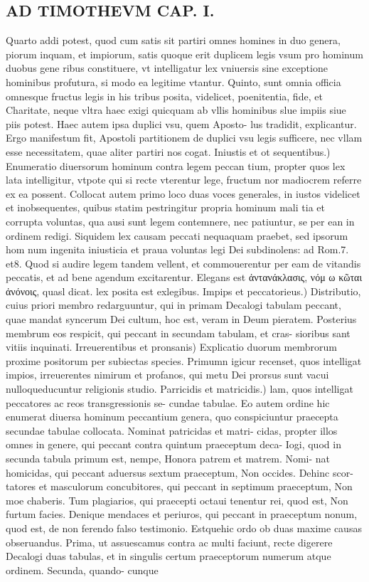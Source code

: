 \documentclass{article}
\begin{document}
\begin{pages}
\section*{AD TIMOTHEVM CAP. I. }
\marginpar{[ p.28 ]}\pstart Quarto addi potest, quod cum satis sit partiri omnes homines in duo genera, piorum inquam, et impiorum, satis quoque  erit duplicem legis vsum pro hominum duobus gene ribus constituere, vt intelligatur lex vniuersis sine exceptione hominibus profutura, si modo ea legitime vtantur. Quinto, sunt omnia officia omnesque  fructus legis in his tribus posita, videlicet, poenitentia, fide, et Charitate, neque  vltra haec exigi quicquam ab vllis hominibus slue impiis siue piis potest. Haec autem ipsa duplici vsu, quem Aposto- lus tradidit, explicantur. Ergo manifestum fit, Apostoli partitionem de duplici vsu legis sufficere, nec vllam esse necessitatem, quae aliter partiri nos cogat.  \pend\pstart Iniustis et ot sequentibus.) Enumeratio diuersorum hominum contra legem peccan tium, propter quos lex lata intelligitur, vtpote qui si recte vterentur lege, fructum nor madiocrem referre ex ea possent. Collocat autem primo loco duas voces generales, in iustos videlicet et inobsequentes, quibus statim pestringitur propria hominum mali tia et corrupta voluntas, qua ausi sunt legem contemnere, nec patiuntur, se per ean in ordinem redigi. Siquidem lex causam peccati nequaquam praebet, sed ipsorum hom num ingenita iniusticia et praua voluntas legi Dei subdinolens: ad Rom.7. et8. Quod si audire legem tandem vellent, et commouerentur per eam de vitandis peccatis, et ad bene agendum excitarentur. Elegans est ἀντανάκλασις, νόμ ω κῶται ἀνόνοις, quasl dicat. lex posita est exlegibus.  \pend\pstart Impips et peccatorieus.) Distributio, cuius priori membro redarguuntur, qui in primam Decalogi tabulam peccant, quae mandat syncerum Dei cultum, hoc est, veram in Deum pieratem. Posterius membrum eos respicit, qui peccant in secundam tabulam, et cras- sioribus sant vitiis inquinati.  \pend\pstart Irreuerentibus et pronsanis) Explicatio duorum membrorum proxime positorum per subiectas species. Primumn igicur recenset, quos intelligat impios, irreuerentes nimirum et profanos, qui metu Dei prorsus sunt vacui nulloqueducuntur religionis studio.  \pend\pstart Parricidis et matricidis.) lam, quos intelligat peccatores ac reos transgressionis se- cundae tabulae. Eo autem ordine hic enumerat diuersa hominum peccantium genera, quo conspiciuntur praecepta secundae tabulae collocata. Nominat patricidas et matri- cidas, propter illos omnes in genere, qui peccant contra quintum praeceptum deca- Iogi, quod in secunda tabula primum est, nempe, Honora patrem et matrem. Nomi- nat homicidas, qui peccant aduersus sextum praeceptum, Non occides. Dehinc scor- tatores et masculorum concubitores, qui peccant in septimum praeceptum, Non moe chaberis. Tum plagiarios, qui praecepti octaui tenentur rei, quod est, Non furtum facies. Denique  mendaces et periuros, qui peccant in praeceptum nonum, quod est, de non ferendo falso testimonio. Estquehic ordo ob duas maxime causas obseruandus. Prima, ut assuescamus contra ac multi faciunt, recte digerere Decalogi duas tabulas, et in singulis certum praeceptorum numerum atque ordinem. Secunda, quando- cunque  
\end{pages}
\end{document}
